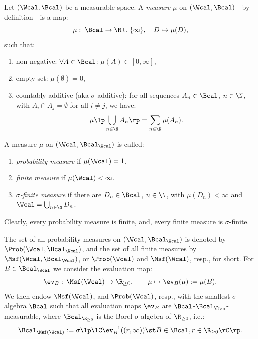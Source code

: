 \begin{Def}[Measures]
    \label{def:measure}
    Let $(\Wcal,\Bcal)$ be a measurable space.
    A \emph{measure} $\mu$ on $(\Wcal,\Bcal)$ - by definition - is a map:
    \[\mu: \; \Bcal \to \R \cup \{\infty\},\quad D \mapsto \mu(D), \]
    such that:
    \begin{enumerate}[label=\roman*)]
        \item non-negative: $\forall A \in \Bcal$: $\mu(A) \in [0,\infty]$,
        \item empty set: $\mu(\emptyset) =0$,
        \item countably additive (aka $\sigma$-additive): for all sequences $A_n \in \Bcal$, $n \in \N$, with $A_i \cap A_j = \emptyset$ for all $i \neq j$, we have:
    \[\mu\lp\bigcup_{n \in \N} A_n\rp = \sum_{n \in \N} \mu(A_n).\]
    \end{enumerate}
\end{Def}

\begin{Def}
    A measure $\mu$ on $(\Wcal,\Bcal_\Wcal)$ is called:
    \begin{enumerate}
        \item \emph{probability measure} if $\mu(\Wcal)=1$.
        \item \emph{finite measure} if $\mu(\Wcal) < \infty$.
        \item \emph{$\sigma$-finite measure} if there are $D_n \in \Bcal$, $n \in \N$, with $\mu(D_n) < \infty$ and $\Wcal = \bigcup_{n \in \N} D_n$.
    \end{enumerate}
\end{Def}

Clearly, every probability measure is finite, and, every finite measure is $\sigma$-finite.

\begin{Def}\label{spaces_of_finite_and_prob_measures}
   The set of all probability measures on $(\Wcal,\Bcal_\Wcal)$ is denoted by $\Prob(\Wcal,\Bcal_\Wcal)$,
   and the set of all finite measures by $\Msf(\Wcal,\Bcal_\Wcal)$, or $\Prob(\Wcal)$ and $\Msf(\Wcal)$, resp., for short.
    For $B \in \Bcal_\Wcal$ we consider 
    the evaluation map:
    \[ \ev_B:\, \Msf(\Wcal) \to \R_{\ge0},\qquad \mu \mapsto \ev_B(\mu):=\mu(B).
    \]
    We then endow $\Msf(\Wcal)$, and $\Prob(\Wcal)$, resp., with the smallest $\sigma$-algebra $\Bcal$
    such that all evaluation maps $\ev_B$ are $\Bcal$-$\Bcal_{\R_{\ge0}}$-measurable, where $\Bcal_{\R_{\ge0}}$
    is the Borel-$\sigma$-algebra of $\R_{\ge 0}$, i.e.:
    \[ \Bcal_{\Msf(\Wcal)}:=\sigma\lp\lC \ev_B^{-1}((r,\infty)) \st B \in \Bcal, r \in \R_{\ge 0} \rC\rp.  \]
\end{Def}


